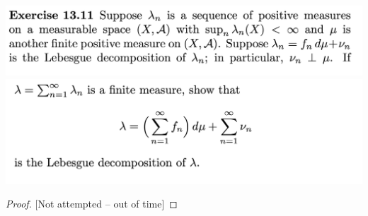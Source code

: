 \newpage
\begin{mdframed}
\includegraphics[width=400pt]{img/analysis--berkeley-202a-hw11-c5a4.png}\\
\includegraphics[width=400pt]{img/analysis--berkeley-202a-hw11-3974.png}
\end{mdframed}

\begin{proof}

  [Not attempted -- out of time]

\end{proof}
